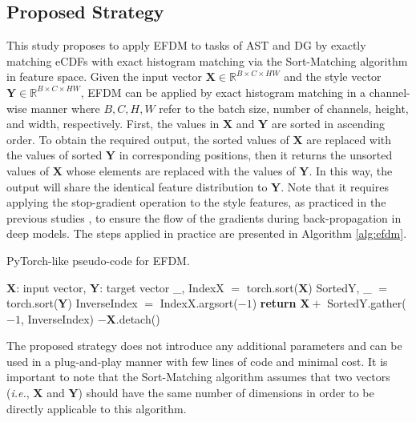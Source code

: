 \subsection{Proposed Strategy}

This study proposes to apply EFDM to tasks of AST and DG by exactly matching eCDFs with exact histogram matching via the Sort-Matching algorithm in feature space. Given the input vector $\mathbf{X} \in \mathbb{R}^{B \times C \times HW}$ and the style vector $\mathbf{Y} \in \mathbb{R}^{B \times C \times HW}$, EFDM can be applied by exact histogram matching in a channel-wise manner where $B, C, H, W$ refer to the batch size, number of channels, height, and width, respectively. First, the values in $\mathbf{X}$ and $\mathbf{Y}$ are sorted in ascending order. To obtain the required output, the sorted values of $\mathbf{X}$ are replaced with the values of sorted $\mathbf{Y}$ in corresponding positions, then it returns the unsorted values of $\mathbf{X}$ whose elements are replaced with the values of $\mathbf{Y}$. In this way, the output will share the identical feature distribution to $\mathbf{Y}$. Note that it requires applying the stop-gradient operation \cite{chen2021exploring} to the style features, as practiced in the previous studies \cite{huang2017arbitrary,zhou2020domain}, to ensure the flow of the gradients during back-propagation in deep models. The steps applied in practice are presented in Algorithm \ref{alg:efdm}.

\begin{algorithm}[!t]
    \caption{PyTorch-like pseudo-code for EFDM.}\label{alg:efdm}
       $\mathbf{X}$: input vector, $\mathbf{Y}$: target vector\newline
       \_, IndexX $=$ torch.sort($\mathbf{X}$)\newline
       SortedY, \_ $=$ torch.sort($\mathbf{Y}$)\newline
       InverseIndex $=$ IndexX.argsort($-1$)\newline
       \textbf{return} $\mathbf{X} +$ SortedY.gather($-1$, InverseIndex) $- \mathbf{X}$.detach()
\end{algorithm}

The proposed strategy does not introduce any additional parameters and can be used in a plug-and-play manner with few lines of code and minimal cost. It is important to note that the Sort-Matching algorithm assumes that two vectors (\textit{i.e.}, $\mathbf{X}$ and $\mathbf{Y}$) should have the same number of dimensions in order to be directly applicable to this algorithm. 

